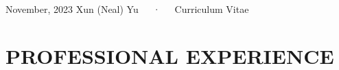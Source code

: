 \documentclass[11pt,a4paper,]{awesome-cv}
\begin{document}
\makecvheader

\makecvfooter
  {November, 2023}
    {Xun (Neal) Yu~~~·~~~Curriculum Vitae}
  {\thepage}





\hypertarget{professional-experience}{%
\section{PROFESSIONAL EXPERIENCE}\label{professional-experience}}
\end{document}
